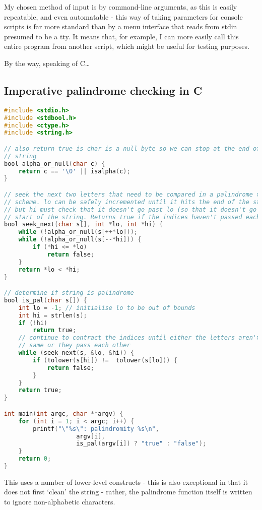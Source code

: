 \documentclass[fleqn,a4paper,11pt]{article}
\begin{document}
    My chosen method of input is by command-line arguments, as this is easily
    repeatable, and even automatable - this way of taking parameters for console
    scripts is far more standard than by a menu interface that reads from stdin
    presumed to be a tty. It means that, for example, I can more easily call
    this entire program from another script, which might be useful for testing
    purposes.

    By the way, speaking of C\ldots

    \subsection{Imperative palindrome checking in C}

\begin{lstlisting}[language=C, caption=Palindrome function in C]
#include <stdio.h>
#include <stdbool.h>
#include <ctype.h>
#include <string.h>

// also return true is char is a null byte so we can stop at the end of the
// string
bool alpha_or_null(char c) {
    return c == '\0' || isalpha(c);
}

// seek the next two letters that need to be compared in a palindrome testing
// scheme. lo can be safely incremented until it hits the end of the string,
// but hi must check that it doesn't go past lo (so that it doesn't go past hte
// start of the string. Returns true if the indices haven't passed each other.
bool seek_next(char s[], int *lo, int *hi) {
    while (!alpha_or_null(s[++*lo]));
    while (!alpha_or_null(s[--*hi])) {
        if (*hi <= *lo)
            return false;
    }
    return *lo < *hi;
}

// determine if string is palindrome
bool is_pal(char s[]) {
    int lo = -1; // initialise lo to be out of bounds
    int hi = strlen(s);
    if (!hi)
        return true;
    // continue to contract the indices until either the letters aren't the
    // same or they pass each other
    while (seek_next(s, &lo, &hi)) {
        if (tolower(s[hi]) !=  tolower(s[lo])) {
            return false;
        }
    }
    return true;
}

int main(int argc, char **argv) {
    for (int i = 1; i < argc; i++) {
        printf("\"%s\": palindromity %s\n",
                    argv[i],
                    is_pal(argv[i]) ? "true" : "false");
    }
    return 0;
}
\end{lstlisting}

    This uses a number of lower-level constructs - this is also exceptional in
    that it does not first `clean' the string - rather, the palindrome function
    itself is written to ignore non-alphabetic characters.
\end{document}
